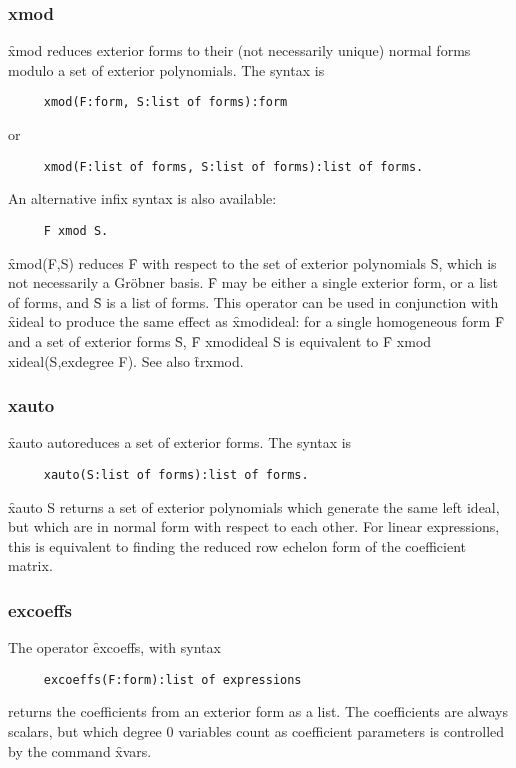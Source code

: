 \subsubsection*{xmod}

\f{xmod} reduces exterior forms to their (not necessarily unique) normal
forms modulo a set of exterior polynomials. The syntax is
\begin{verbatim}
     xmod(F:form, S:list of forms):form
\end{verbatim}
or
\begin{verbatim}
     xmod(F:list of forms, S:list of forms):list of forms.
\end{verbatim}
An alternative infix syntax is also available:
\begin{verbatim}
     F xmod S.
\end{verbatim}
\f{xmod(F,S)} reduces \f{F} with respect to the set of exterior polynomials
\f{S}, which is not necessarily a Gr{\"o}bner basis. \f{F} may be either a
single exterior form, or a list of forms, and \f{S} is a list of
forms. This operator can be used in conjunction with \f{xideal} to produce
the same effect as \f{xmodideal}: for a single homogeneous form \f{F} and a
set of exterior forms \f{S}, \f{F xmodideal S} is equivalent to \f{F xmod
xideal(S,exdegree F)}. See also \f{trxmod}.


\subsubsection*{xauto}

\f{xauto} autoreduces a set of exterior forms. The syntax is
\begin{verbatim}
     xauto(S:list of forms):list of forms.
\end{verbatim}
\f{xauto S} returns a set of exterior polynomials which generate the same
left ideal, but which are in normal form with respect to each other. For
linear expressions, this is equivalent to finding the reduced row echelon
form of the coefficient matrix.


\subsubsection*{excoeffs}

The operator \f{excoeffs}, with syntax
\begin{verbatim}
     excoeffs(F:form):list of expressions
\end{verbatim}
returns the coefficients from an exterior form as a list. The coefficients
are always scalars, but which degree 0 variables count as coefficient
parameters is controlled by the command \f{xvars}.


